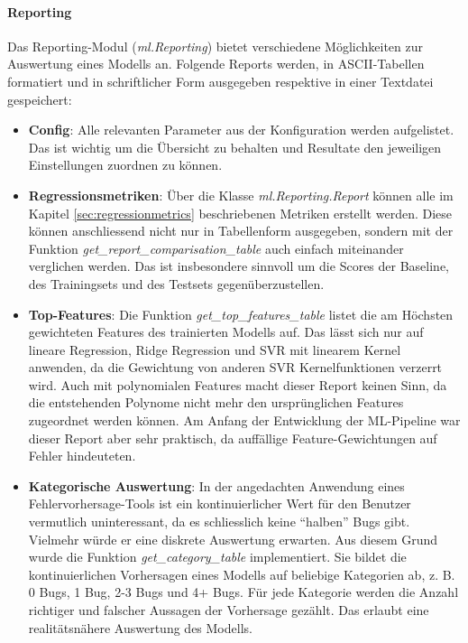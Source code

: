 \documentclass[10pt, a4paper]{article}
\begin{document}
\paragraph{Reporting} Das Re\-port\-ing-Modul (\emph{ml.Reporting}) bietet verschiedene Mög\-lich\-kei\-ten zur Auswertung eines Modells an. Folgende Reports werden, in ASCII-Tabellen formatiert und in schriftlicher Form ausgegeben respektive in einer Textdatei gespeichert:
\begin{itemize}
	\item \textbf{Config}: Alle relevanten Parameter aus der Konfiguration werden aufgelistet. Das ist wichtig um die Übersicht zu behalten und Resultate den jeweiligen Einstellungen zuordnen zu können.
	
	\item \textbf{Regressionsmetriken}: Über die Klasse \emph{ml.Reporting.Report} können alle im Kapitel \ref{sec:regressionmetrics} beschriebenen Metriken erstellt werden. Diese können anschliessend nicht nur in Tabellenform ausgegeben, sondern mit der Funktion \emph{get\_report\_comparisation\_table} auch einfach miteinander verglichen werden. Das ist insbesondere sinnvoll um die Scores der Baseline, des Trainingsets und des Testsets gegenüberzustellen.
	
	\item \textbf{Top-Features}: Die Funktion \emph{get\_top\_features\_table} listet die am Höchsten gewichteten Features des trainierten Modells auf. Das lässt sich nur auf lineare Regression, Ridge Regression und \ac{SVR} mit linearem Kernel anwenden, da die Gewichtung von anderen \ac{SVR} Kernelfunktionen verzerrt wird. Auch mit polynomialen Features macht dieser Report keinen Sinn, da die entstehenden Polynome nicht mehr den ursprünglichen Features zugeordnet werden können. Am Anfang der Entwicklung der ML-Pipeline war dieser Report aber sehr praktisch, da auffällige Feature-Gewichtungen auf Fehler hindeuteten.
	
	\item \textbf{Kategorische Auswertung}: In der angedachten Anwendung eines Feh\-ler\-vor\-her\-sa\-ge-Tools ist ein kontinuierlicher Wert für den Benutzer vermutlich uninteressant, da es schliesslich keine ``halben'' Bugs gibt. Vielmehr würde er eine diskrete Auswertung erwarten. Aus diesem Grund wurde die Funktion \emph{get\_category\_table} implementiert. Sie bildet die kontinuierlichen Vorhersagen eines Modells auf beliebige Kategorien ab, z. B. 0 Bugs, 1 Bug, 2-3 Bugs und 4+ Bugs. Für jede Kategorie werden die Anzahl richtiger und falscher Aussagen der Vorhersage gezählt. Das erlaubt eine realitätsnähere Auswertung des Modells.
	

\end{itemize}
\end{document}
